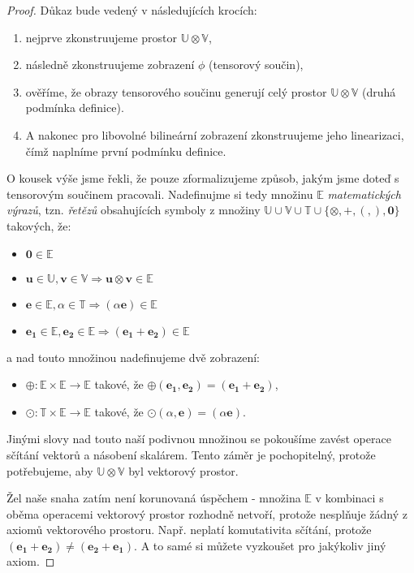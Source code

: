 \documentclass[a5paper,12pt]{amsbook}
\theoremstyle{definition}
\newcommand{\myvec}[1]{\bm{#1}}
\newcommand{\myspace}[1]{\mathbb{#1}}
\begin{document}
\begin{proof}
Důkaz bude vedený v následujících krocích:
\begin{enumerate}
	\item nejprve zkonstruujeme prostor $\myspace{U}\otimes\myspace{V}$,
	\item následně zkonstruujeme zobrazení $\phi$ (tensorový součin),
	\item ověříme, že obrazy tensorového součinu generují celý prostor
	    $\myspace{U}\otimes\myspace{V}$ (druhá podmínka definice).
	\item A nakonec pro libovolné bilineární zobrazení zkonstruujeme
	    jeho linearizaci, čímž naplníme první podmínku definice.
\end{enumerate}

O kousek výše jsme řekli, že pouze zformalizujeme způsob, jakým jsme doteď
s tensorovým součinem pracovali. Nadefinujme si tedy množinu $\myspace{E}$
\textit{matematických výrazů}, tzn. \textit{řetězů} obsahujících symboly
z množiny $\myspace{U}\cup\myspace{V}\cup\myspace{T}\cup\{\otimes, +, (, ),
\myvec{0}\}$ takových, že:
\begin{itemize}
\item $\myvec{0}\in\myspace{E}$
\item $\myvec{u}\in\myspace{U}, \myvec{v}\in\myspace{V}
    \Rightarrow \myvec{u}\otimes\myvec{v}\in\myspace{E}$
\item $\myvec{e}\in\myspace{E}, \alpha\in\myspace{T}
    \Rightarrow (\alpha \myvec{e})\in\myspace{E}$
\item $\myvec{e_1}\in\myspace{E}, \myvec{e_2}\in\myspace{E}
    \Rightarrow (\myvec{e_1}+\myvec{e_2})\in\myspace{E}$
\end{itemize}
a nad touto množinou nadefinujeme dvě zobrazení:
\begin{itemize}
\item $\oplus: \myspace{E}\times\myspace{E}\rightarrow\myspace{E}$ takové,
    že $\oplus(\myvec{e_1}, \myvec{e_2}) = (\myvec{e_1} + \myvec{e_2})$,
\item $\odot: \myspace{T}\times\myspace{E}\rightarrow\myspace{E}$ takové,
    že $\odot(\alpha, \myvec{e}) = (\alpha\myvec{e})$.
\end{itemize}
Jinými slovy nad touto naší podivnou množinou se pokoušíme zavést operace sčítání
vektorů a násobení skalárem. Tento záměr je pochopitelný, protože potřebujeme,
aby $\myspace{U}\otimes\myspace{V}$ byl vektorový prostor.

Žel naše snaha zatím není korunovaná úspěchem - množina $\myspace{E}$ v kombinaci
s oběma operacemi vektorový prostor rozhodně netvoří, protože nesplňuje žádný
z axiomů vektorového prostoru. Např. neplatí komutativita sčítání, protože
$(\myvec{e_1}+\myvec{e_2}) \neq (\myvec{e_2}+\myvec{e_1})$. A to samé si můžete
vyzkoušet pro jakýkoliv jiný axiom.


\end{proof}
\end{document}
